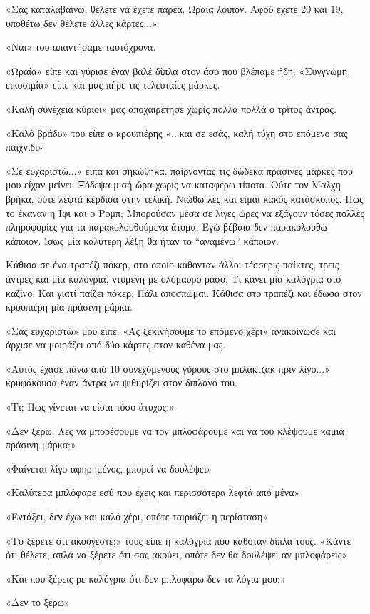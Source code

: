 \documentclass[12pt,twoside, openany]{book}
\begin{document}
«Σας καταλαβαίνω, θέλετε να έχετε παρέα. Ωραία λοιπόν. Αφού έχετε 20 και 19, υποθέτω δεν θέλετε άλλες κάρτες...»

«Ναι» του απαντήσαμε ταυτόχρονα.

«Ωραία» είπε και γύρισε έναν βαλέ δίπλα στον άσο που βλέπαμε ήδη. «Συγγνώμη, εικοσιμία» είπε και μας πήρε τις τελευταίες μάρκες.

«Καλή συνέχεια κύριοι» μας αποχαιρέτησε χωρίς πολλα πολλά ο τρίτος άντρας.

«Καλό βράδυ» του είπε ο κρουπιέρης «...και σε εσάς, καλή τύχη στο επόμενο σας παιχνίδι»

«Σε ευχαριστώ...» είπα και σηκώθηκα, παίρνοντας τις δώδεκα πράσινες μάρκες που μου είχαν μείνει. Ξόδεψα μισή ώρα χωρίς να καταφέρω τίποτα. Ούτε τον Μαλχη βρήκα, ούτε λεφτά κέρδισα στην τελική. Νιώθω λες και είμαι κακός κατάσκοπος. Πώς το έκαναν η Ιφι και ο Ρομπ; Μπορούσαν μέσα σε λίγες ώρες να εξάγουν τόσες πολλές πληροφορίες για τα παρακολουθούμενα άτομα. Εγώ βέβαια δεν παρακολουθώ κάποιον. Ίσως μία καλύτερη λέξη θα ήταν το “αναμένω” κάποιον. 

Κάθισα σε ένα τραπέζι πόκερ, στο οποίο κάθονταν άλλοι τέσσερις παίκτες, τρεις άντρες και μία καλόγρια, ντυμένη με ολόμαυρο ράσο. Τι κάνει μία καλόγρια στο καζίνο; Και γιατί παίζει πόκερ; Πάλι αποσπώμαι. Κάθισα στο τραπέζι και έδωσα στον κρουπιέρη μία πράσινη μάρκα.

«Σας ευχαριστώ» μου είπε. «Ας ξεκινήσουμε το επόμενο χέρι» ανακοίνωσε και άρχισε να μοιράζει από δύο κάρτες στον καθένα μας.

«Αυτός έχασε πάνω από 10 συνεχόμενους γύρους στο μπλάκτζακ πριν λίγο...» κρυφάκουσα έναν άντρα να ψιθυρίζει στον διπλανό του.

«Τι; Πώς γίνεται να είσαι τόσο άτυχος;»

«Δεν ξέρω. Λες να μπορέσουμε να τον μπλοφάρουμε και να του κλέψουμε καμιά πράσινη μάρκα;»

«Φαίνεται λίγο αφηρημένος, μπορεί να δουλέψει»

«Καλύτερα μπλόφαρε εσύ που έχεις και περισσότερα λεφτά από μένα»

«Εντάξει, δεν έχω και καλό χέρι, οπότε ταιριάζει η περίσταση»

«Το ξέρετε ότι ακούγεστε;» τους είπε η καλόγρια που καθόταν δίπλα τους. «Κάντε ότι θέλετε, απλά να ξέρετε ότι σας ακούει, οπότε δεν θα δουλέψει αν μπλοφάρεις»

«Και που ξέρεις ρε καλόγρια ότι δεν μπλοφάρω δεν τα λόγια μου;»

«Δεν το ξέρω»
\end{document}
